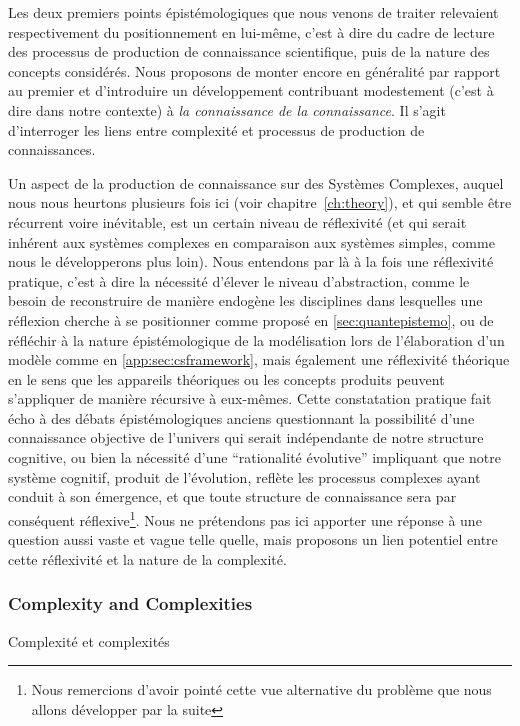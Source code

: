 Les deux premiers points épistémologiques que nous venons de traiter relevaient respectivement du positionnement en lui-même, c'est à dire du cadre de lecture des processus de production de connaissance scientifique, puis de la nature des concepts considérés. Nous proposons de monter encore en généralité par rapport au premier et d'introduire un développement contribuant modestement (c'est à dire dans notre contexte) à \emph{la connaissance de la connaissance}. Il s'agit d'interroger les liens entre complexité et processus de production de connaissances.



Un aspect de la production de connaissance sur des Systèmes Complexes, auquel nous nous heurtons plusieurs fois ici (voir chapitre~\ref{ch:theory}), et qui semble être récurrent voire inévitable, est un certain niveau de réflexivité (et qui serait inhérent aux systèmes complexes en comparaison aux systèmes simples, comme nous le développerons plus loin). Nous entendons par là à la fois une réflexivité pratique, c'est à dire la nécessité d'élever le niveau d'abstraction, comme le besoin de reconstruire de manière endogène les disciplines dans lesquelles une réflexion cherche à se positionner comme proposé en \ref{sec:quantepistemo}, ou de réfléchir à la nature épistémologique de la modélisation lors de l'élaboration d'un modèle comme en \ref{app:sec:csframework}, mais également une réflexivité théorique en le sens que les appareils théoriques ou les concepts produits peuvent s'appliquer de manière récursive à eux-mêmes. Cette constatation pratique fait écho à des débats épistémologiques anciens questionnant la possibilité d'une connaissance objective de l'univers qui serait indépendante de notre structure cognitive, ou bien la nécessité d'une ``rationalité évolutive'' impliquant que notre système cognitif, produit de l'évolution, reflète les processus complexes ayant conduit à son émergence, et que toute structure de connaissance sera par conséquent réflexive\footnote{Nous remercions  d'avoir pointé cette vue alternative du problème que nous allons développer par la suite}. Nous ne prétendons pas ici apporter une réponse à une question aussi vaste et vague telle quelle, mais proposons un lien potentiel entre cette réflexivité et la nature de la complexité.


\subsubsection{Complexity and Complexities}{Complexité et complexités}


